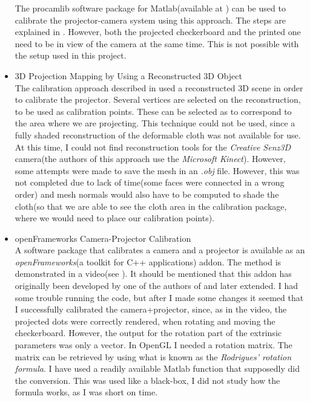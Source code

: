 \documentclass[]{article}
\begin{document}
\begin{itemize}
The procamlib software package for Matlab(available at \cite{procamlib}) can be used to calibrate the projector-camera system using this approach. The steps are explained in \cite{falcao08}. However, both the projected checkerboard and the printed one need to be in view of the camera at the same time. This is not possible with the setup used in this project.\\
\item 3D Projection Mapping by Using a Reconstructed 3D Object\\

The calibration approach described in \cite{vvvv} used a reconstructed 3D scene in order to calibrate the projector. Several vertices are selected on the reconstruction, to be used as calibration points. These can be selected as to correspond to the area where we are projecting. This technique could not be used, since a fully shaded reconstruction of the deformable cloth was not available for use. At this time, I could not find reconstruction tools for the \textit{Creative Senz3D} camera(the authors of this approach use the \textit{Microsoft Kinect}). However, some attempts were made to save the mesh in an \textit{.obj} file. However, this was not completed due to lack of time(some faces were connected in a wrong order) and mesh normals would also have to be computed to shade the cloth(so that we are able to see the cloth area in the calibration package, where we would need to place our calibration points).
\item openFrameworks Camera-Projector Calibration\\

A software package that calibrates a camera and a projector is available as an \textit{openFrameworks}(a toolkit for C++ applications) addon. The method is demonstrated in a video(see \cite{ofx}). It should be mentioned that this addon has originally been developed by one of the authors of \cite{watanabe08} and later extended. I had some trouble running the code, but after I made some changes it seemed that I successfully calibrated the camera+projector, since, as in the video, the projected dots were correctly rendered, when rotating and moving the checkerboard. However, the output for the rotation part of the extrinsic parameters was only a vector. In OpenGL I needed a rotation matrix. The matrix can be retrieved by using what is known as the \textit{Rodrigues' rotation formula}. I have used a readily available Matlab function that supposedly did the conversion. This was used like a black-box, I did not study how the formula works, as I was short on time. 


\end{itemize}
\end{document}
